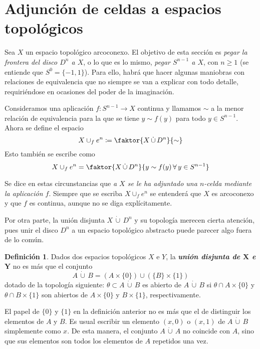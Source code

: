 \documentclass[11pt]{report}
\newenvironment{cdefinition} %
  {\begin{mdframed}[innertopmargin = 0pt,
                    innerbottommargin = 7.5pt,
                    backgroundcolor = lightgray!10,
                    linewidth = 1pt,
                    shadow = true,
                    shadowsize = 5pt,
                    roundcorner = 0pt,
                    skipabove = 0pt]
    \begin{definition}}
  {\end{definition}\end{mdframed}}
\theoremstyle{definition}
\newtheorem{definition}{Definición}[chapter]
\theoremstyle{definition}
\theoremstyle{remark}
\begin{document}
\section{Adjunción de celdas a espacios topológicos}

Sea $X$ un espacio topológico arcoconexo. El objetivo de esta sección es \textit{pegar la frontera del disco $D^n$ a $X$}, o lo que es lo mismo, \textit{pegar $S^{n-1}$ a $X$}, con $n \geq 1$ (se entiende que $S^0 = \{-1,1\}$). Para ello, habrá que hacer algunas maniobras con relaciones de equivalencia que no siempre se van a explicar con todo detalle, requiriéndose en ocasiones del poder de la imaginación.

\vspace{2mm}

Consideramos una aplicación $f \colon S^{n-1} \to X$ continua y llamamos $\sim$ a la menor relación de equivalencia para la que se tiene $y \sim f(y)$ para todo $y \in S^{n-1}$. Ahora se define el espacio
\[X \cup_f e^n \coloneqq \faktor{X \, \dot\cup \, D^n}{\sim}\]
Esto también se escribe como
\[X \cup_f e^n = \faktor{X \, \dot\cup \, D^n}{y \sim f(y) \, \forall \, y \in S^{n-1}}\]

Se dice en estas circunstancias que \textit{a $X$ se le ha adjuntado una $n$-celda mediante la aplicación $f$}. Siempre que se escriba $X \cup_f e^n$ se entenderá que $X$ es arcoconexo y que $f$ es continua, aunque no se diga explícitamente.

\vspace{2mm}

Por otra parte, la unión disjunta $X \, \dot\cup \, D^n$ y su topología merecen cierta atención, pues unir el disco $D^n$ a un espacio topológico abstracto puede parecer algo fuera de lo común.

\hfill

\begin{cdefinition}
Dados dos espacios topológicos $X$ e $Y$, la \textbf{\textit{unión disjunta de $\bm{X}$ e $\bm{Y}$}} no es más que el conjunto
\[A \, \dot\cup \, B = (A \times \{0\}) \cup (\{B\} \times \{1\}) \]
dotado de la topología siguiente: $\theta \subset A \, \dot\cup \, B$ es abierto de $A \, \dot\cup \, B$ si $\theta \cap A \times \{0\}$ y $\theta \cap B \times \{1\}$ son abiertos de $A \times \{0\}$ y $B \times \{1\}$, respectivamente.
\end{cdefinition}

El papel de $\{0\}$ y $\{1\}$ en la definición anterior no es más que el de distinguir los elementos de $A$ y $B$. Es usual escribir un elemento $(x,0)$ o $(x,1)$ de $A \, \dot\cup \, B$ simplemente como $x$. De esta manera, el conjunto $A \, \dot\cup \, A$ no coincide con $A$, sino que sus elementos son todos los elementos de $A$ repetidos una vez.
\end{document}
